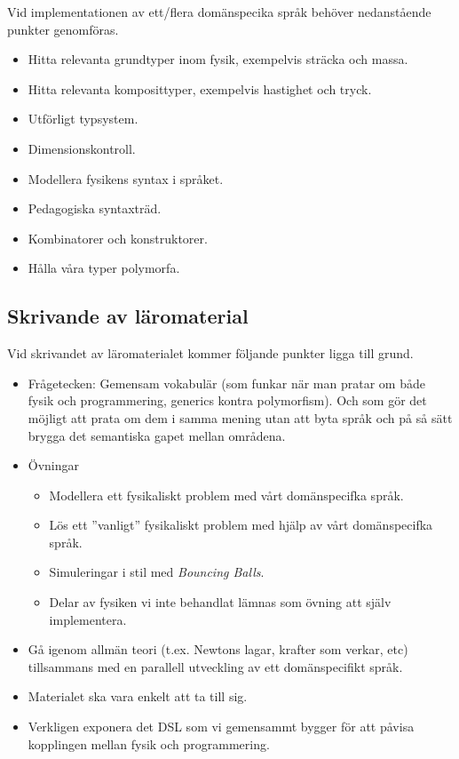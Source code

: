 \documentclass[12pt,a4paper]{scrartcl}
\begin{document}
Vid implementationen av ett/flera domänspecika språk behöver nedanstående punkter genomföras.

\begin{itemize}
    \item Hitta relevanta grundtyper inom fysik, exempelvis sträcka och massa.
    \item Hitta relevanta komposittyper, exempelvis hastighet och tryck.
    \item Utförligt typsystem.
    \item Dimensionskontroll.
    \item Modellera fysikens syntax i språket.
    \item Pedagogiska syntaxträd.
    \item Kombinatorer och konstruktorer.
    \item Hålla våra typer polymorfa.
\end{itemize}

\subsection{Skrivande av läromaterial}

Vid skrivandet av läromaterialet kommer följande punkter ligga till grund.

\begin{itemize}
    \item Frågetecken: Gemensam vokabulär (som funkar när man pratar om både fysik och programmering, generics kontra polymorfism). Och som gör det möjligt att prata om dem i samma mening utan att byta språk och på så sätt brygga det semantiska gapet mellan områdena.
    \item Övningar
        \begin{itemize}
            \item Modellera ett fysikaliskt problem med vårt domänspecifka språk.
            \item Lös ett ''vanligt'' fysikaliskt problem med hjälp av vårt domänspecifka språk.
            \item Simuleringar i stil med \textit{Bouncing Balls}.
            \item Delar av fysiken vi inte behandlat lämnas som övning att själv implementera.
        \end{itemize}
    \item Gå igenom allmän teori (t.ex. Newtons lagar, krafter som verkar, etc) tillsammans med en parallell utveckling av ett domänspecifikt språk.
    \item Materialet ska vara enkelt att ta till sig.
    \item Verkligen exponera det DSL som vi gemensammt bygger för att påvisa kopplingen mellan fysik och programmering.
\end{itemize}
\end{document}
